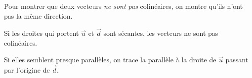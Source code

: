 \documentclass[border=4pt]{standalone}
\begin{document}
\begin{minipage}{8.5cm}\large \colorbox{orange!8}{\begin{minipage}{8.2cm}\par Pour montrer que deux vecteurs \textit{ne sont pas} colinéaires, on montre qu'ils n'ont pas la même direction.\par Si les droites qui portent $\vec{u}$ et $\vec{d}$ sont sécantes, les vecteurs ne sont pas colinéaires.\par Si elles semblent presque parallèles, on trace la parallèle à la droite de $\vec{u}$ passant par l'origine de $\vec{d}$.\vspace{4pt}\end{minipage}}\end{minipage}
\end{document}
